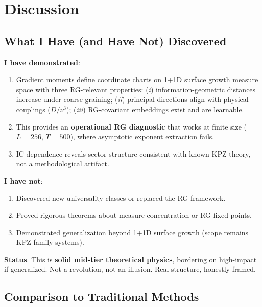 \documentclass[aps,pre,reprint,amsmath,amssymb,superscriptaddress]{revtex4-2}
\begin{document}
\section{Discussion}
\label{sec:discussion}

\subsection{What I Have (and Have Not) Discovered}

\textbf{I have demonstrated}:
\begin{enumerate}
\item Gradient moments define coordinate charts on 1+1D surface growth measure space with three RG-relevant properties: (\textit{i}) information-geometric distances increase under coarse-graining; (\textit{ii}) principal directions align with physical couplings ($D/\nu^3$); (\textit{iii}) RG-covariant embeddings exist and are learnable.

\item This provides an \textbf{operational RG diagnostic} that works at finite size ($L=256$, $T=500$), where asymptotic exponent extraction fails.

\item IC-dependence reveals sector structure consistent with known KPZ theory, not a methodological artifact.
\end{enumerate}

\textbf{I have not}:
\begin{enumerate}
\item Discovered new universality classes or replaced the RG framework.
\item Proved rigorous theorems about measure concentration or RG fixed points.
\item Demonstrated generalization beyond 1+1D surface growth (scope remains KPZ-family systems).
\end{enumerate}

\textbf{Status}. This is \textbf{solid mid-tier theoretical physics}, bordering on high-impact if generalized. Not a revolution, not an illusion. Real structure, honestly framed.

\subsection{Comparison to Traditional Methods}
\end{document}

